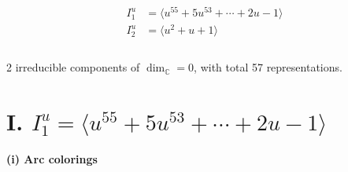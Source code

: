 \documentclass[1p]{elsarticle_modified}
\theoremstyle{definition}
\begin{document}
\begin{align*}
I^u_{1}&=\langle 
u^{55}+5 u^{53}+\cdots+2 u-1\rangle \\
I^u_{2}&=\langle 
u^2+u+1\rangle \\
\\
\end{align*}
\raggedright * 2 irreducible components of $\dim_{\mathbb{C}}=0$, with total 57 representations.\\
\newpage
\renewcommand{\arraystretch}{1}
\centering \section*{I. $I^u_{1}= \langle u^{55}+5 u^{53}+\cdots+2 u-1 \rangle$}
\flushleft \textbf{(i) Arc colorings}\\
\end{document}
